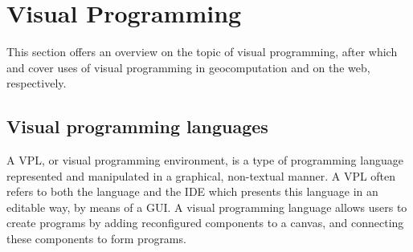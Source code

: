 
\section{Visual Programming}
\label{sec:background-vpl}
 

This section offers an overview on the topic of visual programming, after which  and  cover uses of visual programming in geocomputation and on the web, respectively. 

\subsection*{Visual programming languages}

A \ac{VPL}, or visual programming environment, is a type of programming language represented and manipulated in a graphical, non-textual manner.
A VPL often refers to both the language and the \ac{IDE} which presents this language in an editable way, by means of a \ac{GUI}.
A visual programming language allows users to create programs by adding reconfigured components to a canvas, and connecting these components to form programs. 

